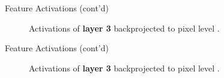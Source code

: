 \documentclass{beamer}
\begin{document}
	\begin{frame}{Feature Activations (cont'd)}
		\begin{figure}
			\centering
			\caption{Activations of \textbf{layer 3} backprojected to pixel level \cite{ZeilerFergus:2013}.}
		\end{figure}
	\end{frame}
	
	\begin{frame}{Feature Activations (cont'd)}
		\begin{figure}
			\centering
			\caption{Activations of \textbf{layer 3} backprojected to pixel level \cite{ZeilerFergus:2013}.}
		\end{figure}
	\end{frame}
	
\end{document}
